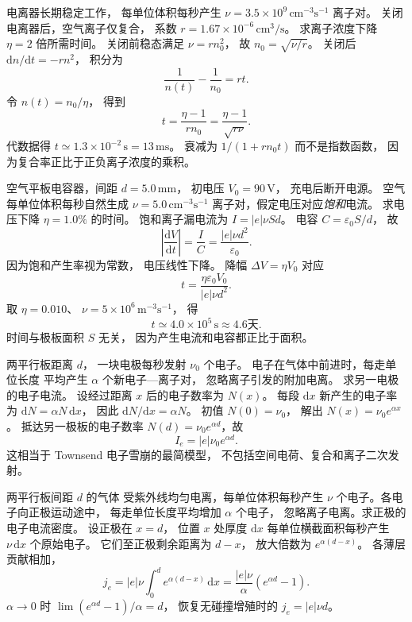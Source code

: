 电离器长期稳定工作，
每单位体积每秒产生
$\nu=3.5\times10^9\,
\mathrm{cm^{-3}s^{-1}}$ 离子对。
关闭电离器后，空气离子仅复合，
系数 $r=1.67\times10^{-6}\,\mathrm{cm^3/s}$。
求离子浓度下降 $\eta=2$ 倍所需时间。
\exsolution
关闭前稳态满足 $\nu=rn_0^2$，
故 $n_0=\sqrt{\nu/r}$。
关闭后
$\mathrm dn/\mathrm dt=-rn^2$，
积分为
\[
\frac1{n(t)}-\frac1{n_0}=rt.
\]
令 $n(t)=n_0/\eta$，
得到
\[
\boxed{t=\frac{\eta-1}{rn_0}
=\frac{\eta-1}{\sqrt{r\nu}}}.
\]
代数据得
$\boxed{t\simeq1.3\times10^{-2}\,\mathrm s
=13\,\mathrm{ms}}$。
\excheck 衰减为 $1/(1+rn_0t)$
而不是指数函数，
因为复合率正比于正负离子浓度的乘积。

空气平板电容器，间距
$d=5.0\,\mathrm{mm}$，
初电压 $V_0=90\,\mathrm V$，
充电后断开电源。
空气每单位体积每秒自然生成
$\nu=5.0\,\mathrm{cm^{-3}s^{-1}}$
离子对，假定电压对应\emph{饱和}电流。
求电压下降 $\eta=1.0\%$ 的时间。
\exsolution
饱和离子漏电流为
$I=|e|\nu Sd$。
电容 $C=\varepsilon_0S/d$，
故
\[
\left|\frac{\mathrm dV}{\mathrm dt}\right|
=\frac IC=\frac{|e|\nu d^2}{\varepsilon_0}.
\]
因为饱和产生率视为常数，
电压线性下降。
降幅 $\Delta V=\eta V_0$ 对应
\[
\boxed{t=\frac{\eta\varepsilon_0V_0}
{|e|\nu d^2}}.
\]
取 $\eta=0.010$、
$\nu=5\times10^6\,\mathrm{m^{-3}s^{-1}}$，
得
\[
\boxed{t\simeq4.0\times10^5\,\mathrm s
\approx4.6\text{天}}.
\]
\excheck 时间与极板面积 $S$ 无关，
因为产生电流和电容都正比于面积。

两平行板距离 $d$，
一块电极每秒发射
$\nu_0$ 个电子。
电子在气体中前进时，每走单位长度
平均产生 $\alpha$ 个新电子—离子对，
忽略离子引发的附加电离。
求另一电极的电子电流。
\exsolution
设经过距离 $x$ 后的电子数率为 $N(x)$。
每段 $\mathrm dx$ 新产生的电子率为
$\mathrm dN=\alpha N\,\mathrm dx$，
因此
$\mathrm dN/\mathrm dx=\alpha N$。
初值 $N(0)=\nu_0$，
解出
$N(x)=\nu_0e^{\alpha x}$。
抵达另一极板的电子数率
$N(d)=\nu_0e^{\alpha d}$，故
\[
\boxed{I_e=|e|\nu_0e^{\alpha d}}.
\]
\excheck 这相当于 Townsend
电子雪崩的最简模型，
不包括空间电荷、复合和离子二次发射。

两平行板间距 $d$ 的气体
受紫外线均匀电离，每单位体积每秒产生
$\nu$ 个电子。各电子向正极运动途中，
每走单位长度平均增加 $\alpha$ 个电子，
忽略离子电离。求正极的电子电流密度。
\exsolution
设正极在 $x=d$，
位置 $x$ 处厚度 $\mathrm dx$
每单位横截面积每秒产生
$\nu\,\mathrm dx$ 个原始电子。
它们至正极剩余距离为 $d-x$，
放大倍数为
$e^{\alpha(d-x)}$。
各薄层贡献相加，
\[
j_e=|e|\nu\int_0^d
e^{\alpha(d-x)}\,\mathrm dx
=\boxed{\frac{|e|\nu}{\alpha}
(e^{\alpha d}-1)}.
\]
\excheck $\alpha\to0$ 时
$\lim(e^{\alpha d}-1)/\alpha=d$，
恢复无碰撞增殖时的
$j_e=|e|\nu d$。
